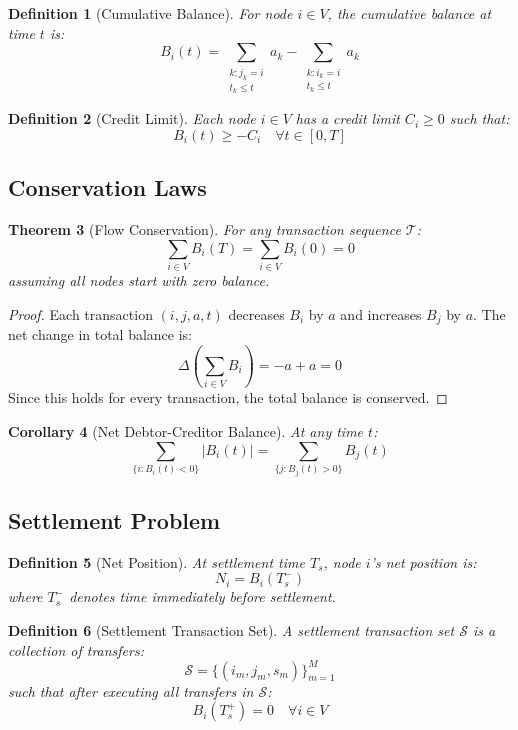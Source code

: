 \documentclass[12pt]{article}
\newtheorem{theorem}{Theorem}
\newtheorem{definition}[theorem]{Definition}
\newtheorem{corollary}[theorem]{Corollary}
\begin{document}
\begin{definition}[Cumulative Balance]
For node $i \in V$, the cumulative balance at time $t$ is:
$$
B_i(t) = \sum_{\substack{k : j_k = i \\ t_k \leq t}} a_k - \sum_{\substack{k : i_k = i \\ t_k \leq t}} a_k
$$
\end{definition}

\begin{definition}[Credit Limit]
Each node $i \in V$ has a credit limit $C_i \geq 0$ such that:
$$
B_i(t) \geq -C_i \quad \forall t \in [0,T]
$$
\end{definition}

\subsection{Conservation Laws}

\begin{theorem}[Flow Conservation]
For any transaction sequence $\mathcal{T}$:
$$
\sum_{i \in V} B_i(T) = \sum_{i \in V} B_i(0) = 0
$$
assuming all nodes start with zero balance.
\end{theorem}

\begin{proof}
Each transaction $(i,j,a,t)$ decreases $B_i$ by $a$ and increases $B_j$ by $a$. The net change in total balance is:
$$
\Delta \left(\sum_{i \in V} B_i\right) = -a + a = 0
$$
Since this holds for every transaction, the total balance is conserved.
\end{proof}

\begin{corollary}[Net Debtor-Creditor Balance]
At any time $t$:
$$
\sum_{\{i : B_i(t) < 0\}} |B_i(t)| = \sum_{\{j : B_j(t) > 0\}} B_j(t)
$$
\end{corollary}

\subsection{Settlement Problem}

\begin{definition}[Net Position]
At settlement time $T_s$, node $i$'s net position is:
$$
N_i = B_i(T_s^-)
$$
where $T_s^-$ denotes time immediately before settlement.
\end{definition}

\begin{definition}[Settlement Transaction Set]
A settlement transaction set $\mathcal{S}$ is a collection of transfers:
$$
\mathcal{S} = \{(i_m, j_m, s_m)\}_{m=1}^{M}
$$
such that after executing all transfers in $\mathcal{S}$:
$$
B_i(T_s^+) = 0 \quad \forall i \in V
$$
\end{definition}
\end{document}
